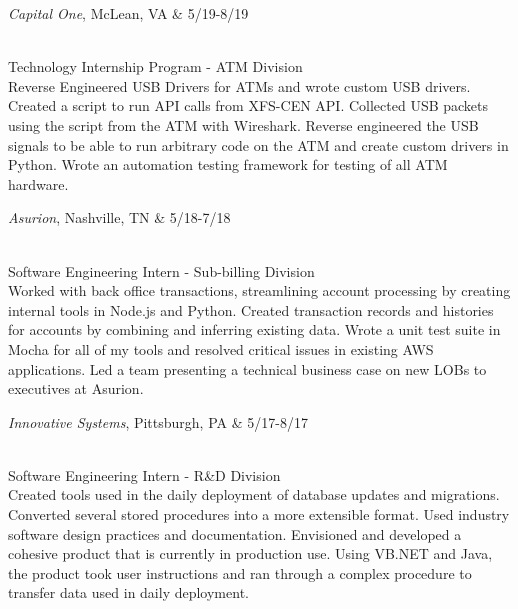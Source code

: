 \documentclass[]{res}
\begin{document}
{			\begin{ncolumn}{2}	
			{\it Capital One}, McLean, VA  & \hfill   5/19-8/19
			\end{ncolumn}\\
			Technology Internship Program - ATM Division \\
			Reverse Engineered USB Drivers for ATMs and wrote custom USB drivers. Created a script to run API calls from XFS-CEN API. Collected USB packets using the script from the ATM with Wireshark. Reverse engineered the USB signals to be able to run arbitrary code on the ATM and create custom drivers in Python. Wrote an automation testing framework for testing of all ATM hardware.
			
			
			\begin{ncolumn}{2}
			{\it Asurion}, Nashville, TN  & \hfill   5/18-7/18
			\end{ncolumn}\\
			Software Engineering Intern - Sub-billing Division\\
			Worked with back office transactions, streamlining account processing by creating internal tools in Node.js and Python. Created transaction records and histories for accounts by combining and inferring existing data. Wrote a unit test suite in Mocha for all of my tools and resolved critical issues in existing AWS applications. Led a team presenting a technical business case on new LOBs to executives at Asurion.
			
			\begin{ncolumn}{2}
			{\it Innovative Systems}, Pittsburgh, PA  & \hfill   5/17-8/17
			\end{ncolumn}\\
			Software Engineering Intern - R\&D Division \\
			Created tools used in the daily deployment of database updates and migrations. Converted several stored procedures into a more extensible format. Used industry software design practices and documentation. Envisioned and developed a cohesive product that is currently in production use. Using VB.NET and Java, the product took user instructions and ran through a complex procedure to transfer data used in daily deployment.
			
}
\end{document}
